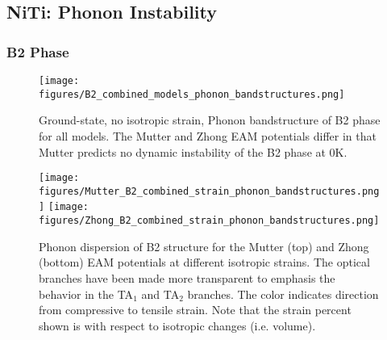 \documentclass[preprint]{elsarticle}
\begin{document}
\subsection{NiTi: Phonon Instability}
\label{subsec:niphonons}


\subsubsection{B2 Phase}
\label{subsubsec:b2}

\begin{figure}[ht!]
    \begin{centering}
        \texttt{[image: figures/B2\_combined\_models\_phonon\_bandstructures.png]}
        \caption{
          Ground-state, no isotropic strain, Phonon bandstructure of B2 phase for all models. The Mutter and Zhong EAM potentials differ in that Mutter predicts no dynamic instability of the B2 phase at 0K. 
        }
        \label{fig:allmodels_no_strainphonon_b2}
    \end{centering}
\end{figure}


\begin{figure}[ht!]
    \begin{centering}
        \texttt{[image: figures/Mutter\_B2\_combined\_strain\_phonon\_bandstructures.png]}
        \vspace{1mm}
        \texttt{[image: figures/Zhong\_B2\_combined\_strain\_phonon\_bandstructures.png]}
        \caption{
           Phonon dispersion of B2 structure for the Mutter (top) and Zhong (bottom)  EAM potentials at different isotropic strains. The optical branches have been made more transparent to emphasis the behavior in the TA$_1$ and TA$_2$ branches. The color indicates direction from compressive to tensile strain. Note that the strain percent shown is with respect to isotropic changes (i.e. volume). 
        }
        \label{fig:mutter_zhong_phonon_b2}
    \end{centering}
\end{figure}


\end{document}
